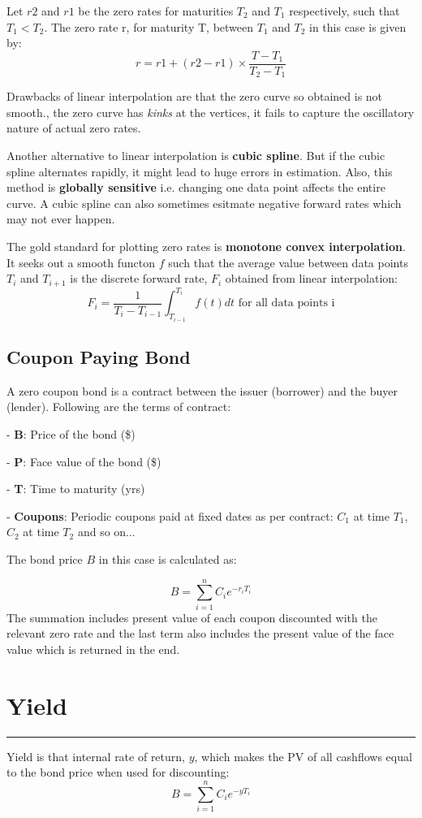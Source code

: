 \documentclass[DIV=15, fleqn, oneside, 10pt]{scrartcl}
\theoremstyle{clean}
\newcommand{\sep}{%
  \par\medskip
  \hrule
  \bigskip
}
\begin{document}
Let $r2$ and $r1$ be the zero rates for maturities $T_2$ and $T_1$ respectively, such that 
$T_1 < T_2$. The zero rate r, for maturity T, between $T_1$ and $T_2$ in this case is given by:
\[
r = r1 + (r2 - r1) \times \frac{T - T_1}{T_2 - T_1}
\]

Drawbacks of linear interpolation are that the zero curve so obtained is not smooth., 
the zero curve has \textit{kinks} at the vertices,
it fails to capture the oscillatory nature of actual zero rates.

Another alternative to linear interpolation is \textbf{cubic spline}. But if the cubic spline
alternates rapidly, it might lead to huge errors in estimation. Also, this method is \textbf{
    globally sensitive
} i.e. changing one data point affects the entire curve. A cubic spline can also sometimes esitmate
negative forward rates which may not ever happen.

The gold standard for plotting zero rates is \textbf{monotone convex interpolation}. It seeks out
a smooth functon $f$ such that the average value between data points $T_i$ and $T_{i + 1}$ is
the discrete forward rate, $F_i$ obtained from linear interpolation:
\[
F_i = \frac{1}{T_i - T_{i-1}} \int_{T_{i-1}}^{T_i} f(t) dt \text{ for all data points i}
\]

\newpage
\subsection*{Coupon Paying Bond}
A zero coupon bond is a contract between the issuer (borrower) and the buyer (lender). Following
are the terms of contract:

 - \textbf{B}: Price of the bond (\$)

 - \textbf{P}: Face value of the bond (\$)

 - \textbf{T}: Time to maturity (yrs)

 - \textbf{Coupons}: Periodic coupons paid at fixed dates as per contract: $C_1$ at time $T_1$,
  $C_2$ at time $T_2$ and so on...

The bond price $B$ in this case is calculated as:

\[
B = \sum_{i = 1}^{n}{C_{i} e^{-r_i T_i}}
\]
The summation includes present value of each coupon discounted with the relevant zero rate and the
last term also includes the present value of the face value which is returned in the end.

\section*{Yield}
\sep
Yield is that internal rate of return, $y$, which makes the PV of all cashflows equal to the bond
price when used for discounting:
\[
B = \sum_{i = 1}^{n}{C_{i} e^{-y T_i}}
\]
\end{document}
